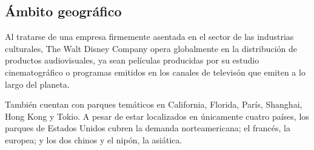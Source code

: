 \subsection{Ámbito geográfico}

Al tratarse de una empresa firmemente asentada en el sector de las industrias culturales, The Walt Disney Company opera globalmente en la distribución de productos audiovisuales, ya sean películas producidas por su estudio cinematográfico o programas emitidos en los canales de televisón que emiten a lo largo del planeta.

También cuentan con parques temáticos en California, Florida, París, Shanghai, Hong Kong y Tokio. A pesar de estar localizados en únicamente cuatro países, los parques de Estados Unidos cubren la demanda norteamericana; el francés, la europea; y los dos chinos y el nipón, la asiática.